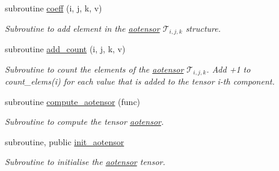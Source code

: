\begin{DoxyCompactItemize}
subroutine \hyperlink{namespaceaotensor__def_a0da983fc262aa15a3fde0d6138825660}{coeff} (i, j, k, v)
\begin{DoxyCompactList}\small\item\em Subroutine to add element in the \hyperlink{namespaceaotensor__def_a0dc43bc9294a18f2fe57b67489f1702f}{aotensor} $\mathcal{T}_{i,j,k}$ structure. \end{DoxyCompactList}\item 
subroutine \hyperlink{namespaceaotensor__def_ac8104c190904681c1fd27eec036114aa}{add\+\_\+count} (i, j, k, v)
\begin{DoxyCompactList}\small\item\em Subroutine to count the elements of the \hyperlink{namespaceaotensor__def_a0dc43bc9294a18f2fe57b67489f1702f}{aotensor} $\mathcal{T}_{i,j,k}$. Add +1 to count\+\_\+elems(i) for each value that is added to the tensor i-\/th component. \end{DoxyCompactList}\item 
subroutine \hyperlink{namespaceaotensor__def_a3dfccbce01ca1616c616f855c0cfa45a}{compute\+\_\+aotensor} (func)
\begin{DoxyCompactList}\small\item\em Subroutine to compute the tensor \hyperlink{namespaceaotensor__def_a0dc43bc9294a18f2fe57b67489f1702f}{aotensor}. \end{DoxyCompactList}\item 
subroutine, public \hyperlink{namespaceaotensor__def_ac2d5a88885d06f6dc047bee3a4ab427a}{init\+\_\+aotensor}
\begin{DoxyCompactList}\small\item\em Subroutine to initialise the \hyperlink{namespaceaotensor__def_a0dc43bc9294a18f2fe57b67489f1702f}{aotensor} tensor. \end{DoxyCompactList}\end{DoxyCompactItemize}
